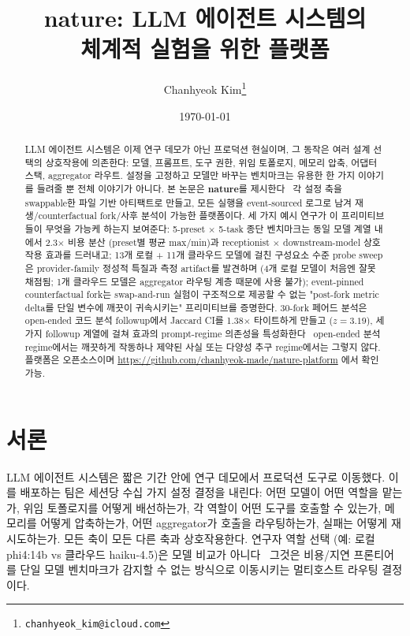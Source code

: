 \documentclass[11pt,a4paper]{article}
\title{\textbf{nature}: LLM 에이전트 시스템의\\
       체계적 실험을 위한 플랫폼}
\author{Chanhyeok Kim\thanks{\texttt{chanhyeok\_kim@icloud.com}}}
\date{\today}
\begin{document}
\maketitle

\begin{abstract}
LLM 에이전트 시스템은 이제 연구 데모가 아닌 프로덕션 현실이며, 그
동작은 여러 설계 선택의 상호작용에 의존한다: 모델, 프롬프트, 도구
권한, 위임 토폴로지, 메모리 압축, 어댑터 스택, aggregator 라우트.
설정을 고정하고 모델만 바꾸는 벤치마크는 유용한 한 가지 이야기를
들려줄 뿐 전체 이야기가 아니다. 본 논문은 \textbf{nature}를 제시한다
\textemdash\ 각 설정 축을 swappable한 파일 기반 아티팩트로 만들고,
모든 실행을 event-sourced 로그로 남겨 재생/counterfactual fork/사후
분석이 가능한 플랫폼이다. 세 가지 예시 연구가 이 프리미티브들이
무엇을 가능케 하는지 보여준다: 5-preset $\times$ 5-task 종단 벤치마크는
동일 모델 계열 내에서 2.3$\times$ 비용 분산 (preset별 평균 max/min)과 receptionist $\times$
downstream-model 상호작용 효과를 드러내고; 13개 로컬 + 11개 클라우드
모델에 걸친 구성요소 수준 probe sweep은 provider-family 정성적 특질과
측정 artifact를 발견하며 (4개 로컬 모델이 처음엔 잘못 채점됨; 1개
클라우드 모델은 aggregator 라우팅 계층 때문에 사용 불가);
event-pinned counterfactual fork는 swap-and-run 실험이 구조적으로
제공할 수 없는 "post-fork metric delta를 단일 변수에 깨끗이
귀속시키는" 프리미티브를 증명한다. 30-fork 페어드 분석은 open-ended
코드 분석 followup에서 Jaccard CI를 1.38$\times$ 타이트하게 만들고
($z=3.19$), 세 가지 followup 계열에 걸쳐 효과의 prompt-regime 의존성을
특성화한다 \textemdash\ open-ended 분석 regime에서는 깨끗하게
작동하나 제약된 사실 또는 다양성 추구 regime에서는 그렇지 않다.
플랫폼은 오픈소스이며 \url{https://github.com/chanhyeok-made/nature-platform}
에서 확인 가능.
\end{abstract}

\section{서론}

LLM 에이전트 시스템은 짧은 기간 안에 연구 데모에서 프로덕션 도구로
이동했다. 이를 배포하는 팀은 세션당 수십 가지 설정 결정을 내린다:
어떤 모델이 어떤 역할을 맡는가, 위임 토폴로지를 어떻게 배선하는가,
각 역할이 어떤 도구를 호출할 수 있는가, 메모리를 어떻게 압축하는가,
어떤 aggregator가 호출을 라우팅하는가, 실패는 어떻게 재시도하는가.
모든 축이 모든 다른 축과 상호작용한다. 연구자 역할 선택 (예: 로컬
phi4:14b vs 클라우드 haiku-4.5)은 모델 비교가 아니다 \textemdash\
그것은 비용/지연 프론티어를 단일 모델 벤치마크가 감지할 수 없는
방식으로 이동시키는 멀티호스트 라우팅 결정이다.
\end{document}
